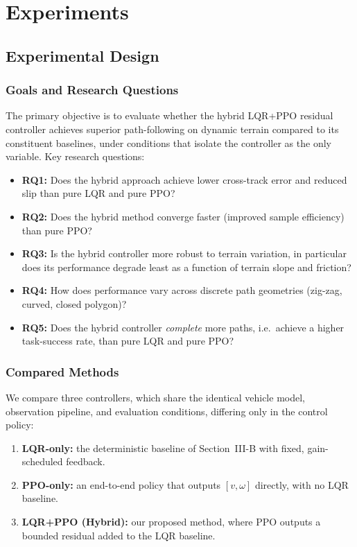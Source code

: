 \documentclass[conference]{IEEEtran}
\begin{document}
\section{Experiments}
\subsection{Experimental Design}
\subsubsection{Goals and Research Questions}
The primary objective is to evaluate whether the hybrid LQR+PPO residual controller achieves superior path-following on dynamic terrain compared to its constituent baselines, under conditions that isolate the controller as the only variable. Key research questions:
\begin{itemize}
\item \textbf{RQ1:} Does the hybrid approach achieve lower cross-track error and reduced slip than pure LQR and pure PPO?
\item \textbf{RQ2:} Does the hybrid method converge faster (improved sample efficiency) than pure PPO?
\item \textbf{RQ3:} Is the hybrid controller more robust to terrain variation, in particular does its performance degrade least as a function of terrain slope and friction?
\item \textbf{RQ4:} How does performance vary across discrete path geometries (zig-zag, curved, closed polygon)?
\item \textbf{RQ5:} Does the hybrid controller \emph{complete} more paths, i.e.\ achieve a higher task-success rate, than pure LQR and pure PPO?
\end{itemize}

\subsubsection{Compared Methods}
We compare three controllers, which share the identical vehicle model, observation pipeline, and evaluation conditions, differing only in the control policy:
\begin{enumerate}
\item \textbf{LQR-only:} the deterministic baseline of Section~III-B with fixed, gain-scheduled feedback.
\item \textbf{PPO-only:} an end-to-end policy that outputs $[v,\omega]$ directly, with no LQR baseline.
\item \textbf{LQR+PPO (Hybrid):} our proposed method, where PPO outputs a bounded residual added to the LQR baseline.
\end{enumerate}
\end{document}
